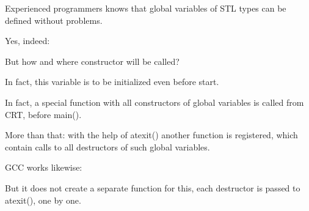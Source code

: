 Experienced \Cpp programmers knows that global variables of \ac{STL} types can be defined without problems.

Yes, indeed:



But how and where  constructor will be called?

In fact, this variable is to be initialized even before \main start.








In fact, a special function with all constructors of global variables is called from \ac{CRT}, before
main().

More than that: with the help of atexit() another function is registered, 
which contain calls to all destructors of such global variables.

GCC works likewise:



But it does not create a separate function for this, 
each destructor is passed to atexit(), one by one.


